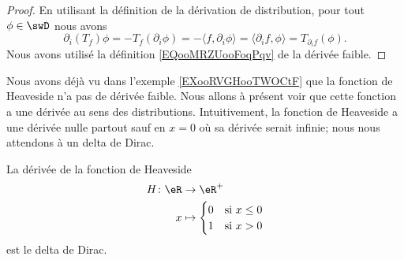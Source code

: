 \begin{proof}
    En utilisant la définition de la dérivation de distribution, pour tout \( \phi\in \swD\) nous avons
    \begin{equation}
        \partial_i(T_f)\phi=-T_f(\partial_i\phi)=-\langle f, \partial_i\phi\rangle =\langle \partial_if, \phi\rangle =T_{\partial_if}(\phi).
    \end{equation}
    Nous avons utilisé la définition \eqref{EQooMRZUooFoqPqv} de la dérivée faible.
\end{proof}

Nous avons déjà vu dans l'exemple \ref{EXooRVGHooTWOCtF} que la fonction de Heaveside n'a pas de dérivée faible. Nous allons à présent voir que cette fonction a une dérivée au sens des distributions. Intuitivement, la fonction de Heaveside a une dérivée nulle partout sauf en \( x=0\) où sa dérivée serait infinie; nous nous attendons à un delta de Dirac. 
    
\begin{proposition}     \label{PROPooVUDVooAlwZzB}
    La dérivée de la fonction de Heaveside
    \begin{equation}
        \begin{aligned}
            H\colon \eR&\to \eR^+ \\
            x&\mapsto \begin{cases}
                0    &   \text{si } x\leq 0\\
                1    &    \text{si }x>0
            \end{cases}
        \end{aligned}
    \end{equation}
    est le delta de Dirac.
\end{proposition}
    
